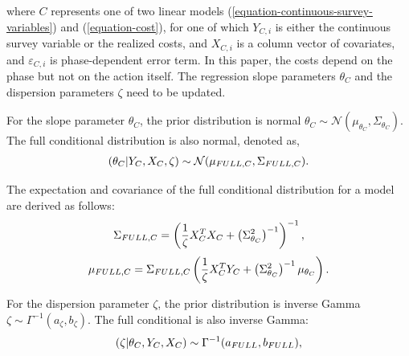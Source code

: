 \documentclass[12pt]{article}
\begin{document}
\begin{appendices}
where $C$ represents one of two linear models (\ref{equation-continuous-survey-variables}) and (\ref{equation-cost}), for one of which $Y_{C,i}$ is either the continuous survey variable or the realized costs, and $X_{C,i}$ is a column vector of covariates, and $\varepsilon_{C,i}$ is phase-dependent error term. In this paper, the costs depend on the phase but not on the action itself.
The regression slope parameters $\theta_C$ and the dispersion parameters $\zeta$ need to be updated.

For the slope parameter $\theta_C$, the prior distribution is normal $\theta_C \sim \mathcal{N}\left(\mu_{\theta_C},\Sigma_{\theta_C}\right)$.
The full conditional distribution is also normal, denoted as,
\let\saveeqnno\theequation
\let\savefrac\frac
\def\dispfrac{\displaystyle\savefrac}
\begin{eqnarray}
\let\frac\dispfrac
\gdef\theequation{A4}
\let\theHequation\theequation
\label{equation-full-conditionals-continuous-slope}
	(\theta_{C}|Y_C,X_C,\zeta) \sim \mathcal{N}(\mu_{FULL,C},\Sigma_{FULL,C}).
\end{eqnarray}
\global\let\theequation\saveeqnno
\addtocounter{equation}{-1}\ignorespaces

The expectation and covariance of the full conditional distribution for a model are derived as follows:
\let\saveeqnno\theequation
\let\savefrac\frac
\def\dispfrac{\displaystyle\savefrac}
\begin{eqnarray}
\let\frac\dispfrac
\gdef\theequation{A5}
\let\theHequation\theequation
\label{equation-full-conditionals-continuous-sigma}
	\Sigma_{FULL,C}=\left(\dfrac{1}{\zeta}X_C^TX_C+\left(\Sigma^2_{\theta_C}\right)^{-1}\right)^{-1},
\end{eqnarray}
\begin{eqnarray}
\let\frac\dispfrac
\gdef\theequation{A6}
\let\theHequation\theequation
\label{equation-full-conditionals-continuous-mu}
	\mu_{FULL,C}=\Sigma_{FULL,C}\left(\dfrac{1}{\zeta}X_C^TY_C+\left(\Sigma^2_{\theta_C}\right)^{-1}\mu_{\theta_C}\right).
\end{eqnarray}
\global\let\theequation\saveeqnno
\addtocounter{equation}{-1}\ignorespaces

For the dispersion parameter $\zeta$, the prior distribution is inverse Gamma $\zeta \sim \Gamma^{-1}(a_\zeta,b_\zeta)$. The full conditional is also inverse Gamma:
\let\saveeqnno\theequation
\let\savefrac\frac
\def\dispfrac{\displaystyle\savefrac}
\begin{eqnarray}
\let\frac\dispfrac
\gdef\theequation{A7}
\let\theHequation\theequation
\label{equation-full-conditionals-continuous-dispersion}
	(\zeta|\theta_C,Y_C,X_C) \sim \Gamma^{-1}(a_{FULL},b_{FULL}),
\end{eqnarray}
\global\let\theequation\saveeqnno
\addtocounter{equation}{-1}\ignorespaces


\end{appendices}
\end{document}
